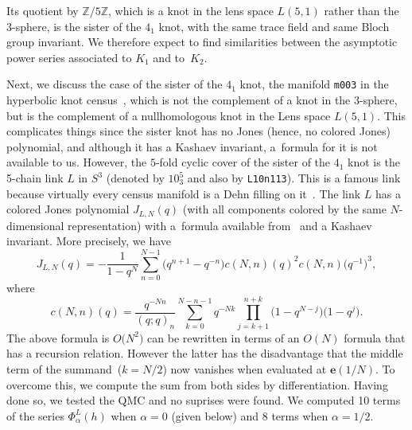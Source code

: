 \documentclass[pdftex]{sigma}
\numberwithin{equation}{section}
\def\BZ{\mathbb Z}
\def\e{\mathbf{e}}
\def\a{\alpha}
\def\e{\mathbf{e}}
\def\a{\alpha}
\def\K#1{{K_{#1}}}
\begin{document}
Its quotient by $\BZ/5\BZ$, which
is a knot in the lens space $L(5,1)$ rather than the 3-sphere,
is the sister of the $4_1$ knot, with the same trace field and same
Bloch group invariant. We therefore
expect to find similarities between the asymptotic power series
associated to $\K1$ and to~$\K2$.

Next, we discuss the case of the sister of the $4_1$ knot, the manifold
\texttt{m003} in the hyperbolic knot census~\cite{snappy}, which is not
the complement of a knot in the 3-sphere, but is the complement of a
nullhomologous knot in the Lens space $L(5,1)$. This complicates things
since the sister knot has no Jones (hence, no colored Jones) polynomial,
and although it has a Kashaev invariant, a~formula for it is not available
to us. However, the $5$-fold cyclic cover of the sister of the
$4_1$ knot is the 5-chain link $L$ in $S^3$ \big(denoted by $10^5_3$ and also
by \texttt{L10n113}\big). This is a famous link because virtually every census
manifold is a Dehn filling on it~\cite{Dunfield-Thurston}. The link $L$
has a colored Jones polynomial
$J_{L,N}(q)$ (with all components colored by the same $N$-dimensional
representation) with a~formula available from~\cite{VV}
and a Kashaev invariant. More precisely, we have
\[
J_{L,N}(q) = -\frac{1}{1-q^N}
\sum_{n=0}^{N-1} \big(q^{n+1}-q^{-n}\big)c(N,n)(q)^2 c(N,n)\big(q^{-1}\big)^3,
\]
where
\[
c(N,n)(q)=\frac{q^{-Nn}}{(q;q)_n}\sum_{k=0}^{N-n-1} q^{-Nk}
\prod_{j=k+1}^{n+k} \big(1-q^{N-j}\big)\big(1-q^j\big) .
\]
\noindent
The above formula is $O\big(N^2\big)$ can be rewritten in terms of an $O(N)$
formula that has a recursion relation. However the latter has the
disadvantage that the middle term of the
summand~(${k=N/2}$) now vanishes when evaluated at $\e(1/N)$. To overcome
this, we compute the sum from both sides by differentiation. Having done so,
we tested the QMC and no suprises were found. We computed 10 terms of the
series $\Phi^{L}_\a(h)$ when $\a=0$ (given below)
and 8 terms when $\a=1/2$.
\end{document}
